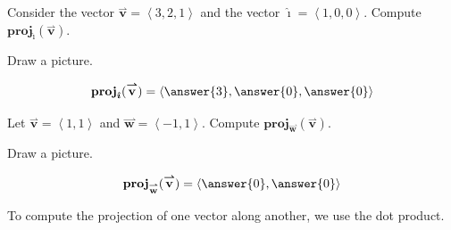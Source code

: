 \documentclass{ximera}
\begin{document}
\begin{question}
  Consider the vector $\overset{\boldsymbol{\rightharpoonup}}{\mathbf{v}}=\left< 3,2,1 \right>$ and the vector $\boldsymbol{\hat{\imath}} =
  \left< 1,0,0 \right>$.  Compute $\mathbf{proj}_{\boldsymbol{\hat{\imath}}}(\overset{\boldsymbol{\rightharpoonup}}{\mathbf{v}})$.
  \begin{hint}
    Draw a picture.
  \end{hint}
  \begin{prompt}
    \[
    \mathbf{proj}_{\boldsymbol{\hat{\imath}}}(\overset{\boldsymbol{\rightharpoonup}}{\mathbf{v}}) = \left< \answer{3},\answer{0},\answer{0} \right>
    \]
  \end{prompt}
  \begin{question}
    Let $\overset{\boldsymbol{\rightharpoonup}}{\mathbf{v}} = \left< 1,1 \right>$ and $\overset{\boldsymbol{\rightharpoonup}}{\mathbf{w}}= \left< -1,1 \right>$. Compute
    $\mathbf{proj}_{\overset{\boldsymbol{\rightharpoonup}}{\mathbf{w}}}(\overset{\boldsymbol{\rightharpoonup}}{\mathbf{v}})$.
    \begin{hint}
      Draw a picture.
    \end{hint}
      \begin{prompt}
        \[
        \mathbf{proj}_{\overset{\boldsymbol{\rightharpoonup}}{\mathbf{w}}}(\overset{\boldsymbol{\rightharpoonup}}{\mathbf{v}}) = \left< \answer{0},\answer{0} \right>
        \]
      \end{prompt}
  \end{question}
\end{question}

To compute the projection of one vector along another, we use the dot
product.
\end{document}
